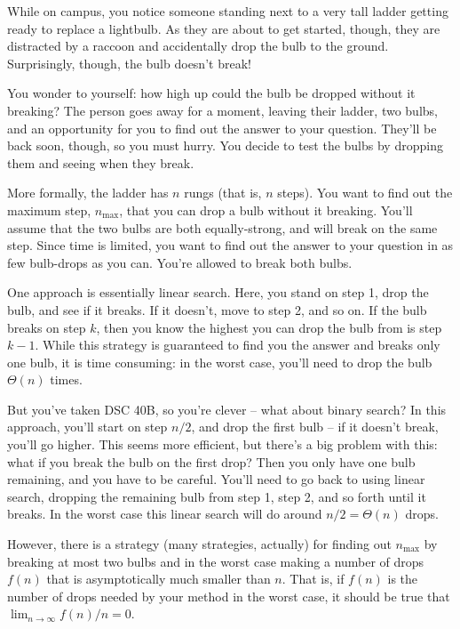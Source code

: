 \begin{prob}
    While on campus, you notice someone standing next to a very tall ladder
    getting ready to replace a lightbulb. As they are about to get started,
    though, they are distracted by a raccoon and accidentally drop the bulb to
    the ground. Surprisingly, though, the bulb doesn't break!

    You wonder to yourself: how high up could the bulb be dropped without it
    breaking? The person goes away for a moment, leaving their ladder, two
    bulbs, and an opportunity for you to find out the answer to your question.
    They'll be back soon, though, so you must hurry. You decide to test the
    bulbs by dropping them and seeing when they break.

    More formally, the ladder has $n$ rungs (that is, $n$ steps). You want to
    find out the maximum step, $n_\text{max}$, that you can drop a bulb without
    it breaking. You'll assume that the two bulbs are both equally-strong, and
    will break on the same step. Since time is limited, you want to find out the
    answer to your question in as few bulb-drops as you can. You're allowed to
    break both bulbs.

    One approach is essentially linear search. Here, you stand on step 1, drop
    the bulb, and see if it breaks. If it doesn't, move to step 2, and so on. If
    the bulb breaks on step $k$, then you know the highest you can drop the bulb
    from is step $k - 1$. While this strategy is guaranteed to find you the
    answer and breaks only one bulb, it is time consuming: in the worst case,
    you'll need to drop the bulb $\Theta(n)$ times.

    But you've taken DSC 40B, so you're clever -- what about binary search?
    In this approach, you'll start on step $n / 2$, and drop the first bulb --
    if it doesn't break, you'll go higher.
    This seems more efficient, but there's a big problem with this: what if you
    break the bulb on the first drop? Then you only have one bulb remaining,
    and you have to be careful. You'll need to go back to using linear search,
    dropping the remaining bulb from step 1, step 2, and so forth until it
    breaks. In the worst case this linear search will do around $n/2 =
    \Theta(n)$ drops.

    However, there is a strategy (many strategies, actually) for finding out
    $n_\text{max}$ by breaking at most two bulbs and in the worst case making a
    number of drops $f(n)$ that is asymptotically much smaller than $n$. That
    is, if $f(n)$ is the number of drops needed by your method in the worst
    case, it should be true that $\lim_{n \to \infty} f(n) / n = 0$.


\end{prob}
